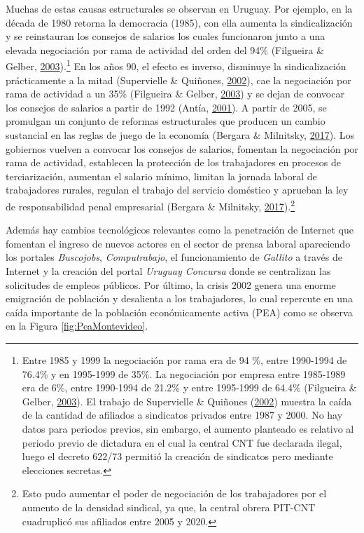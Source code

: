 \documentclass[12pt,oneside]{reedthesis}
\begin{document}
Muchas de estas causas estructurales se observan en Uruguay. Por ejemplo, en la década de 1980 retorna la democracia (1985), con ella aumenta la sindicalización y se reinstauran los consejos de salarios los cuales funcionaron junto a una elevada negociación por rama de actividad del orden del 94\% (Filgueira \& Gelber, \protect\hyperlink{ref-Filgueira2003}{2003}).\footnote{Entre 1985 y 1999 la negociación por rama era de 94 \%, entre 1990-1994 de 76.4\% y en 1995-1999 de 35\%. La negociación por empresa entre 1985-1989 era de 6\%, entre 1990-1994 de 21.2\% y entre 1995-1999 de 64.4\% (Filgueira \& Gelber, \protect\hyperlink{ref-Filgueira2003}{2003}). El trabajo de Supervielle \& Quiñones (\protect\hyperlink{ref-Quinones2001}{2002}) muestra la caída de la cantidad de afiliados a sindicatos privados entre 1987 y 2000. No hay datos para periodos previos, sin embargo, el aumento planteado es relativo al periodo previo de dictadura en el cual la central CNT fue declarada ilegal, luego el decreto 622/73 permitió la creación de sindicatos pero mediante elecciones secretas.} En los años 90, el efecto es inverso, disminuye la sindicalización prácticamente a la mitad (Supervielle \& Quiñones, \protect\hyperlink{ref-Quinones2001}{2002}), cae la negociación por rama de actividad a un 35\% (Filgueira \& Gelber, \protect\hyperlink{ref-Filgueira2003}{2003}) y se dejan de convocar los consejos de salarios a partir de 1992 (Antía, \protect\hyperlink{ref-Antia2001}{2001}). A partir de 2005, se promulgan un conjunto de reformas estructurales que producen un cambio sustancial en las reglas de juego de la economía (Bergara \& Milnitsky, \protect\hyperlink{ref-Bergara2017}{2017}). Los gobiernos vuelven a convocar los consejos de salarios, fomentan la negociación por rama de actividad, establecen la protección de los trabajadores en procesos de terciarización, aumentan el salario mínimo, limitan la jornada laboral de trabajadores rurales, regulan el trabajo del servicio doméstico y aprueban la ley de responsabilidad penal empresarial (Bergara \& Milnitsky, \protect\hyperlink{ref-Bergara2017}{2017}).\footnote{Esto pudo aumentar el poder de negociación de los trabajadores por el aumento de la densidad sindical, ya que, la central obrera PIT-CNT cuadruplicó sus afiliados entre 2005 y 2020.}

Además hay cambios tecnológicos relevantes como la penetración de Internet que fomentan el ingreso de nuevos actores en el sector de prensa laboral apareciendo los portales \emph{Buscojobs}, \emph{Computrabajo}, el funcionamiento de \emph{Gallito} a través de Internet y la creación del portal \emph{Uruguay Concursa} donde se centralizan las solicitudes de empleos públicos. Por último, la crisis 2002 genera una enorme emigración de población y desalienta a los trabajadores, lo cual repercute en una caída importante de la población económicamente activa (PEA) como se observa en la Figura \ref{fig:PeaMontevideo}.
\end{document}
